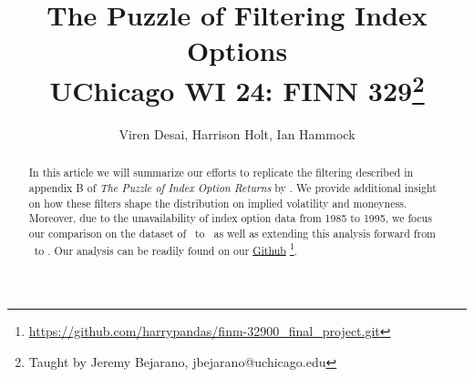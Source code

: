 \newcommand*{\MyHeaderPath}{.}%
\newcommand*{\PathToAssets}{../assets}%
\newcommand*{\PathToOutput}{../output}%
\newcommand*{\PathToBibFile}{bibliography.bib}%














\title{
The Puzzle of Filtering Index Options
\\{\color{blue} \large UChicago WI 24: FINN 329\footnote{Taught by Jeremy Bejarano, jbejarano@uchicago.edu }}
}

\author{
Viren Desai, Harrison Holt, Ian Hammock 
}

\begin{titlepage}

% 
\maketitle


\doublespacing
\begin{abstract}
In this article we will summarize our efforts to replicate the filtering described in appendix B of \textit{The Puzzle of Index Option Returns} by \citet{constantinides2013}. We provide additional insight on how these filters shape the distribution on implied volatility and moneyness. Moreover, due to the unavailability of index option data from 1985 to 1995, we focus our comparison on the dataset of \STARTONE\  to \ENDONE\ as well as extending this analysis forward from \STARTTWO\  to \ENDTWO. Our analysis can be readily found on our \href{https://github.com/harrypandas/finm-32900_final_project.git}{Github} \footnote{ \url{https://github.com/harrypandas/finm-32900_final_project.git} }.  


\end{abstract}


\end{titlepage}

